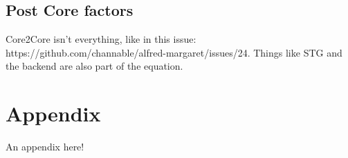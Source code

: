 \documentclass{report}
\begin{document}
\section{Post Core factors}
Core2Core isn't everything, like in this issue: https://github.com/channable/alfred-margaret/issues/24.
Things like STG and the backend are also part of the equation.




\appendix
\clearpage
{}
\chapter{Appendix}
An appendix here!
\end{document}

